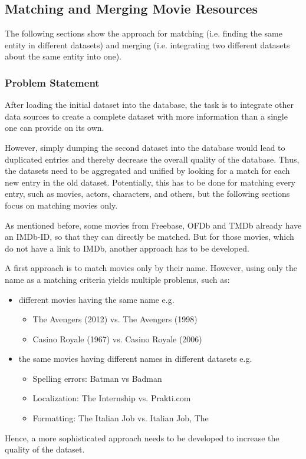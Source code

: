 \subsection{Matching and Merging Movie Resources}
\label{subsec_method_matching}

The following sections show the approach for matching (i.e. finding the same entity in different datasets)
and merging (i.e. integrating two different datasets about the same entity into one).

\subsubsection{Problem Statement}
After loading the initial dataset into the database, the task is to integrate other data sources to create a complete dataset with more information than a single one can provide on its own.

However, simply dumping the second dataset into the database would lead to duplicated entries and thereby decrease the overall quality of the database.
Thus, the datasets need to be aggregated and unified by looking for a match for each new entry in the old dataset.
Potentially, this has to be done for matching every entry, such as movies, actors, characters, and others, but the following sections focus on matching movies only.

As mentioned before, some movies from Freebase, OFDb and TMDb already have an IMDb-ID, so that they can directly be matched.
But for those movies, which do not have a link to IMDb, another approach has to be developed.

A first approach is to match movies only by their name.
However, using only the name as a matching criteria yields multiple problems, such as:
\begin{itemize}
	\item different movies having the same name e.g.
	\begin{itemize}
        \item The Avengers (2012) vs. The Avengers (1998)
        \item Casino Royale (1967) vs. Casino Royale (2006)
    \end{itemize}
	\item the same movies having different names in different datasets e.g.
	\begin{itemize}
        \item Spelling errors: Batman vs Badman
        \item Localization: The Internship vs. Prakti.com
        \item Formatting: The Italian Job vs. Italian Job, The
     \end{itemize}
\end{itemize}
Hence, a more sophisticated approach needs to be developed to increase the quality of the dataset.

